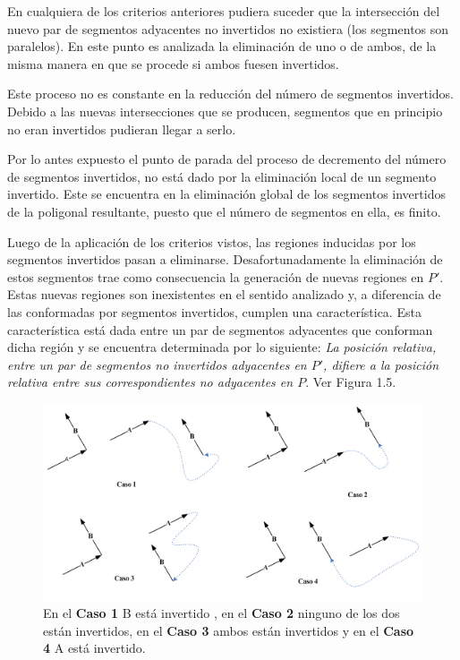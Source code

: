 \documentclass[12pt,english]{report}
\begin{document}
En cualquiera de los criterios anteriores pudiera suceder que la intersecci\'on del nuevo par de segmentos adyacentes no invertidos no existiera (los segmentos son paralelos). En este punto  es analizada la eliminaci\'on de uno o de ambos, de la misma manera en que se procede si ambos fuesen invertidos. 

Este proceso no es constante en la reducci\'on del n\'umero de segmentos invertidos. Debido a las nuevas intersecciones que se producen, segmentos que en principio no eran invertidos pudieran llegar a serlo. 

Por lo antes expuesto el punto de parada del proceso de decremento del n\'umero de segmentos invertidos, no est\'a dado por la eliminaci\'on local de un segmento invertido. Este se encuentra en la eliminaci\'on global de los segmentos invertidos de la poligonal resultante, puesto que el n\'umero de segmentos en ella, es finito. 

Luego de la aplicaci\'on de los criterios vistos, las regiones inducidas por los segmentos invertidos pasan a eliminarse. Desafortunadamente la eliminaci\'on de estos segmentos trae como consecuencia la generaci\'on de nuevas regiones en $P'$. Estas nuevas regiones son inexistentes en el sentido analizado y, a diferencia de las conformadas por segmentos invertidos, cumplen una caracter\'istica. Esta caracter\'istica est\'a dada entre un par de segmentos adyacentes que conforman dicha regi\'on y se encuentra determinada por lo siguiente: \textit{La posici\'on relativa, entre un par de segmentos no invertidos adyacentes en  $P'$, difiere a la posici\'on relativa entre sus correspondientes no adyacentes en $P$}. Ver Figura 1.5. 


\begin{figure}[htbp]
\begin{center}
\includegraphics[width=15cm]{casos1.jpg}%
\end{center}
\caption{En el \textbf{Caso 1} B est\'a invertido , en el \textbf{Caso 2} ninguno de los dos est\'an invertidos, en el \textbf{Caso 3} ambos est\'an invertidos y en el \textbf{Caso 4} A est\'a invertido.}
\end{figure}
\end{document}
